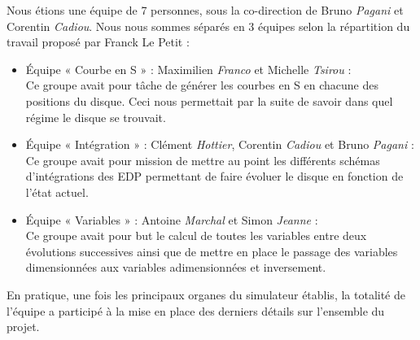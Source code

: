 Nous étions une équipe de 7 personnes, sous la co-direction de Bruno \textit{Pagani} et Corentin \textit{Cadiou}. Nous nous sommes séparés en 3 équipes selon la répartition du travail proposé par Franck Le Petit :
\begin{itemize}
    \item Équipe « Courbe en S » : Maximilien \textit{Franco} et Michelle \textit{Tsirou} :
    \\Ce groupe avait pour tâche de générer les courbes en S en chacune des positions du disque. Ceci nous permettait par la suite de savoir dans quel régime le disque se trouvait.
    \item Équipe « Intégration » : Clément \textit{Hottier}, Corentin \textit{Cadiou} et Bruno \textit{Pagani} :
    \\Ce groupe avait pour mission de mettre au point les différents schémas d'intégrations des EDP permettant de faire évoluer le disque en fonction de l'état actuel.
    \item Équipe « Variables » : Antoine \textit{Marchal} et Simon \textit{Jeanne} :
    \\Ce groupe avait pour but le calcul de toutes les variables entre deux évolutions successives ainsi que de mettre en place le passage des variables dimensionnées aux variables adimensionnées et inversement.
\end{itemize}
En pratique, une fois les principaux organes du simulateur établis, la totalité de l'équipe a participé à la mise en place des derniers détails sur l'ensemble du projet. 
